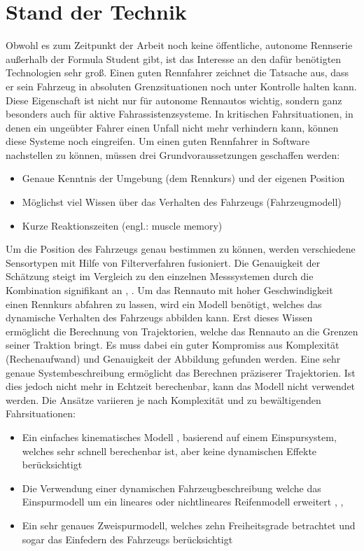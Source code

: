 \documentclass{like}
\begin{document}
\chapter{Stand der Technik}
Obwohl es zum Zeitpunkt der Arbeit noch keine öffentliche, autonome Rennserie außerhalb der Formula Student gibt, ist das Interesse an den dafür benötigten Technologien sehr groß.
Einen guten Rennfahrer zeichnet die Tatsache aus, dass er sein Fahrzeug in absoluten Grenzsituationen noch unter Kontrolle halten kann. Diese Eigenschaft ist nicht nur für autonome Rennautos wichtig, sondern ganz besonders auch für aktive Fahrassistenzsysteme. In kritischen Fahrsituationen, in denen ein ungeübter Fahrer einen Unfall nicht mehr verhindern kann, können diese Systeme noch eingreifen. Um einen guten Rennfahrer in Software nachstellen zu können, müssen drei Grundvoraussetzungen geschaffen werden:
\begin{itemize}
	\item Genaue Kenntnis der Umgebung (dem Rennkurs) und der eigenen Position
	\item Möglichst viel Wissen über das Verhalten des Fahrzeugs (Fahrzeugmodell)
	\item Kurze Reaktionszeiten (engl.: muscle memory)
\end{itemize}

Um die Position des Fahrzeugs genau bestimmen zu können, werden verschiedene Sensortypen mit Hilfe von Filterverfahren fusioniert. Die Genauigkeit der Schätzung steigt im Vergleich zu den einzelnen Messsystemen durch die Kombination signifikant an \cite{GPS_Fusion}, \cite{GPS_IMU_Fusion}. 
Um das Rennauto mit hoher Geschwindigkeit einen Rennkurs abfahren zu lassen, wird ein Modell benötigt, welches das dynamische Verhalten des Fahrzeugs abbilden kann. Erst dieses Wissen ermöglicht die Berechnung von Trajektorien, welche das Rennauto an die Grenzen seiner Traktion bringt. Es muss dabei ein guter Kompromiss aus Komplexität (Rechenaufwand) und Genauigkeit der Abbildung gefunden werden.
Eine sehr genaue Systembeschreibung ermöglicht das Berechnen präziserer Trajektorien. Ist dies jedoch nicht mehr in Echtzeit berechenbar, kann das Modell nicht verwendet werden.
Die Ansätze variieren je nach Komplexität und zu bewältigenden Fahrsituationen:
\begin{itemize}
	\item Ein einfaches kinematisches Modell \cite{MPC_Kinetic}, basierend auf einem Einspursystem, welches sehr schnell berechenbar ist, aber keine dynamischen Effekte berücksichtigt
	
	\item Die Verwendung einer dynamischen Fahrzeugbeschreibung welche das Einspurmodell um ein lineares oder nichtlineares Reifenmodell erweitert \cite{rc_car_1_43}, \cite{MPC_Dynamic}, \cite{MPC_Dynamic_Tire_Model}
	
	\item Ein sehr genaues Zweispurmodell, welches zehn Freiheitsgrade betrachtet und sogar das Einfedern des Fahrzeugs berücksichtigt \cite{doi:10.1137/S0036144502414942} 
\end{itemize}
\end{document}
